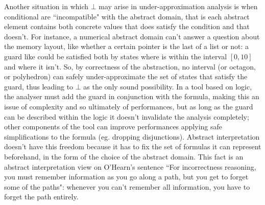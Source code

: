 Another situation in which $\bot$ may arise in under-approximation analysis is when conditional are ``incompatible" with the abstract domain, that is each abstract element contains both concrete values that does satisfy the condition and that doesn't.
For instance, a numerical abstract domain can't answer a question about the memory layout, like whether a certain pointer is the last of a list or not: a guard like  could be satisfied both by states where  is within the interval $[0, 10]$ and where it isn't. So, by correctness of the abstraction, no interval (or octagon, or polyhedron) can safely under-approximate the set of states that satisfy the guard, thus leading to $\bot$ as the only sound possibility.
In a tool based on logic, the analyser must add the guard in conjunction with the formula, making this an issue of complexity and so ultimately of performances, but as long as the guard can be described within the logic it doesn't invalidate the analysis completely; other components of the tool can improve performances applying safe simplifications to the formula (eg. dropping disjunctions).
Abstract interpretation doesn't have this freedom because it has to fix the set of formulas it can represent beforehand, in the form of the choice of the abstract domain. This fact is an abstract interpretation view on O'Hearn's sentence \cite{ohearn-incorrectness-logic} ``For incorrectness reasoning, you must remember information as you go along a path, but you get to forget some of the paths": whenever you can't remember all information, you have to forget the path entirely.
